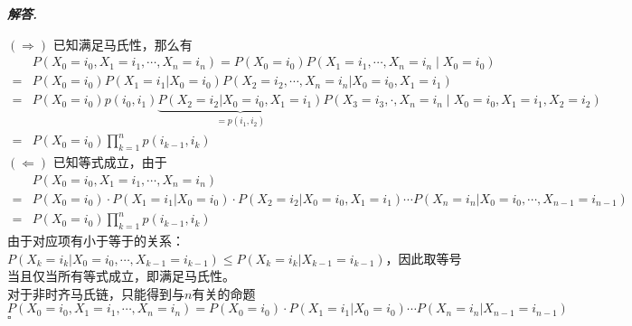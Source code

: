 \documentclass[10pt, a4paper, oneside]{ctexart}
\newenvironment{solution}{%
  \par\noindent\textbf{\textit{解答. }}\ignorespaces
}{%
  \hfill\ensuremath{\square}\par %
}
\begin{document}
\begin{solution}
$(\Rightarrow)$ 已知满足马氏性，那么有
\begin{align*}
&P\left( {{X}_{0} = {i}_{0},{X}_{1} = {i}_{1},\cdots ,{X}_{n} ={i}_{n}}\right)=P(X_0=i_0)P(X_1=i_1,\cdots,X_n=i_n\mid X_0=i_0)\\
=&P(X_0=i_0)P(X_1=i_1|X_0=i_0)P(X_2=i_2,\cdots,X_n=i_n|X_0=i_0,X_1=i_1)\\
=&P(X_0=i_0)p(i_0,i_1)\underbrace{P(X_2=i_2|X_0=i_0,X_1=i_1)}_{=p(i_1,i_2)}P(X_3=i_3,\cdot,X_n=i_n\mid X_0=i_0,X_1=i_1,X_2=i_2)\\
=&P\left( {{X}_{0} = {i}_{0}}\right) \mathop{\prod }\limits_{{k = 1}}^{n}p\left( {{i}_{k - 1},{i}_{k}}\right) 
\end{align*}
$(\Leftarrow)$ 已知等式成立，由于
\begin{align*}
    &P\left( {{X}_{0} = {i}_{0},{X}_{1} = {i}_{1},\cdots ,{X}_{n} = {i}_{n}}\right)\\
    =&P(X_0=i_0)\cdot P(X_1=i_1|X_0=i_0)\cdot P(X_2=i_2|X_0=i_0,X_1=i_1)\cdots P(X_n=i_n|X_0=i_0,\cdots,X_{n-1}=i_{n-1})\\
    =&P\left( {{X}_{0} = {i}_{0}}\right) \mathop{\prod }\limits_{{k = 1}}^{n}p\left( {{i}_{k - 1},{i}_{k}}\right)
\end{align*}
由于对应项有小于等于的关系：$P(X_k=i_k|X_0=i_0,\cdots,X_{k-1}=i_{k-1})\leq P(X_k=i_k|X_{k-1}=i_{k-1})$，因此取等号当且仅当所有等式成立，即满足马氏性。\\
对于非时齐马氏链，只能得到与$n$有关的命题
$$P\left( {{X}_{0} = {i}_{0},{X}_{1} = {i}_{1},\cdots ,{X}_{n} = {i}_{n}}\right)=P(X_0=i_0)\cdot P(X_1=i_1|X_0=i_0)\cdots P(X_n=i_n|X_{n-1}=i_{n-1})$$
\end{solution}
\end{document}
